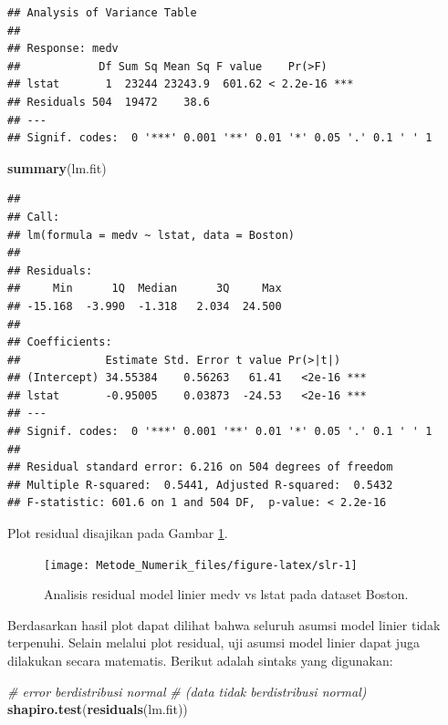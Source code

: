 \documentclass[]{book}
\newenvironment{Shaded}{\begin{snugshade}}{\end{snugshade}}
\newcommand{\CommentTok}[1]{\textcolor[rgb]{0.56,0.35,0.01}{\textit{#1}}}
\newcommand{\KeywordTok}[1]{\textcolor[rgb]{0.13,0.29,0.53}{\textbf{#1}}}
\newcommand{\NormalTok}[1]{#1}
\theoremstyle{definition}
\theoremstyle{definition}
\theoremstyle{definition}
\theoremstyle{remark}
\begin{document}
\begin{verbatim}
## Analysis of Variance Table
## 
## Response: medv
##            Df Sum Sq Mean Sq F value    Pr(>F)    
## lstat       1  23244 23243.9  601.62 < 2.2e-16 ***
## Residuals 504  19472    38.6                      
## ---
## Signif. codes:  0 '***' 0.001 '**' 0.01 '*' 0.05 '.' 0.1 ' ' 1
\end{verbatim}

\begin{Shaded}
\begin{Highlighting}[]
\KeywordTok{summary}\NormalTok{(lm.fit)}
\end{Highlighting}
\end{Shaded}

\begin{verbatim}
## 
## Call:
## lm(formula = medv ~ lstat, data = Boston)
## 
## Residuals:
##     Min      1Q  Median      3Q     Max 
## -15.168  -3.990  -1.318   2.034  24.500 
## 
## Coefficients:
##             Estimate Std. Error t value Pr(>|t|)    
## (Intercept) 34.55384    0.56263   61.41   <2e-16 ***
## lstat       -0.95005    0.03873  -24.53   <2e-16 ***
## ---
## Signif. codes:  0 '***' 0.001 '**' 0.01 '*' 0.05 '.' 0.1 ' ' 1
## 
## Residual standard error: 6.216 on 504 degrees of freedom
## Multiple R-squared:  0.5441, Adjusted R-squared:  0.5432 
## F-statistic: 601.6 on 1 and 504 DF,  p-value: < 2.2e-16
\end{verbatim}

Plot residual disajikan pada Gambar \ref{fig:slr}.

\begin{figure}

{\centering \texttt{[image: Metode\_Numerik\_files/figure-latex/slr-1]} 

}

\caption{Analisis residual model linier medv vs lstat pada dataset Boston.}\label{fig:slr}
\end{figure}

Berdasarkan hasil plot dapat dilihat bahwa seluruh asumsi model linier tidak terpenuhi. Selain melalui plot residual, uji asumsi model linier dapat juga dilakukan secara matematis. Berikut adalah sintaks yang digunakan:

\begin{Shaded}
\begin{Highlighting}[]
\CommentTok{# error berdistribusi normal }
\CommentTok{# (data tidak berdistribusi normal)}
\KeywordTok{shapiro.test}\NormalTok{(}\KeywordTok{residuals}\NormalTok{(lm.fit))}
\end{Highlighting}
\end{Shaded}
\end{document}
